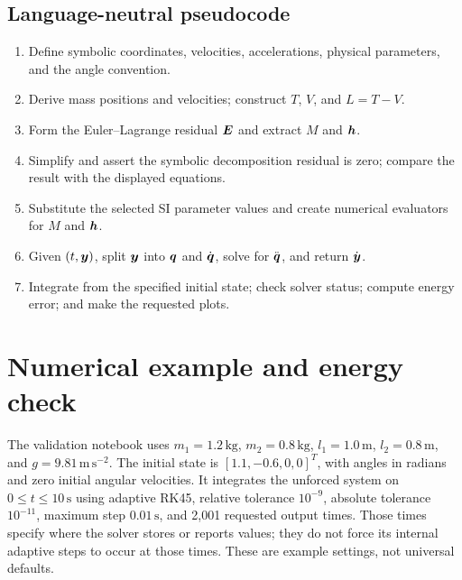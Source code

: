 \documentclass[../main.tex]{subfiles}
\begin{document}
\subsection{Language-neutral pseudocode}

\begin{enumerate}
	\item Define symbolic coordinates, velocities, accelerations, physical parameters, and the angle convention.
	\item Derive mass positions and velocities; construct $T$, $V$, and $L=T-V$.
	\item Form the Euler--Lagrange residual $\boldsymbol{E}$ and extract $M$ and $\boldsymbol{h}$.
	\item Simplify and assert the symbolic decomposition residual is zero; compare the result with the displayed equations.
	\item Substitute the selected SI parameter values and create numerical evaluators for $M$ and $\boldsymbol{h}$.
	\item Given $(t,\boldsymbol{y})$, split $\boldsymbol{y}$ into $\boldsymbol{q}$ and $\dot{\boldsymbol{q}}$, solve for $\ddot{\boldsymbol{q}}$, and return $\dot{\boldsymbol{y}}$.
	\item Integrate from the specified initial state; check solver status; compute energy error; and make the requested plots.
\end{enumerate}

\section{Numerical example and energy check}

The validation notebook uses $m_1=1.2\,\mathrm{kg}$, $m_2=0.8\,\mathrm{kg}$, $l_1=1.0\,\mathrm{m}$, $l_2=0.8\,\mathrm{m}$, and $g=9.81\,\mathrm{m\,s^{-2}}$. The initial state is $[1.1,-0.6,0,0]^T$, with angles in radians and zero initial angular velocities. It integrates the unforced system on $0\le t\le10\,\mathrm{s}$ using adaptive RK45, relative tolerance $10^{-9}$, absolute tolerance $10^{-11}$, maximum step $0.01\,\mathrm{s}$, and 2,001 requested output times. Those times specify where the solver stores or reports values; they do not force its internal adaptive steps to occur at those times. These are example settings, not universal defaults.
\end{document}
